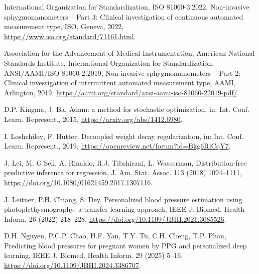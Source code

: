 \documentclass[preprint,12pt]{elsarticle}
\begin{document}
\begin{enumerate}[label={[\arabic*]},leftmargin=2.2em]
\item International Organization for Standardization, ISO 81060-3:2022, Non-invasive sphygmomanometers -- Part 3: Clinical investigation of continuous automated measurement type, ISO, Geneva, 2022, \url{https://www.iso.org/standard/71161.html}.
\item Association for the Advancement of Medical Instrumentation, American National Standards Institute, International Organization for Standardization, ANSI/AAMI/ISO 81060-2:2019, Non-invasive sphygmomanometers -- Part 2: Clinical investigation of intermittent automated measurement type, AAMI, Arlington, 2019, \url{https://aami.org/standard/ansi-aami-iso-81060-22019-pdf/}.
\item D.P. Kingma, J. Ba, Adam: a method for stochastic optimization, in: Int. Conf. Learn. Represent., 2015, \url{https://arxiv.org/abs/1412.6980}.
\item I. Loshchilov, F. Hutter, Decoupled weight decay regularization, in: Int. Conf. Learn. Represent., 2019, \url{https://openreview.net/forum?id=Bkg6RiCqY7}.
\item J. Lei, M. G'Sell, A. Rinaldo, R.J. Tibshirani, L. Wasserman, Distribution-free predictive inference for regression, J. Am. Stat. Assoc. 113 (2018) 1094--1111, \url{https://doi.org/10.1080/01621459.2017.1307116}.
\item J. Leitner, P.H. Chiang, S. Dey, Personalized blood pressure estimation using photoplethysmography: a transfer learning approach, IEEE J. Biomed. Health Inform. 26 (2022) 218--228, \url{https://doi.org/10.1109/JBHI.2021.3085526}.
\item D.H. Nguyen, P.C.P. Chao, H.F. Yan, T.Y. Tu, C.H. Cheng, T.P. Phan, Predicting blood pressures for pregnant women by PPG and personalized deep learning, IEEE J. Biomed. Health Inform. 29 (2025) 5--16, \url{https://doi.org/10.1109/JBHI.2024.3386707}.
\end{enumerate}
\end{document}
